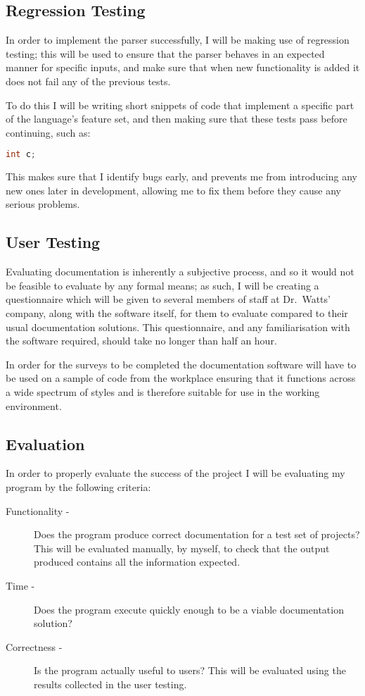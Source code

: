  \subsection{Regression Testing}
    In order to implement the parser successfully, I will be making use of
    regression testing; this will be used to ensure that the parser behaves
    in an expected manner for specific inputs, and make sure that when new
    functionality is added it does not fail any of the previous tests.

    To do this I will be writing short snippets of code that implement a
    specific part of the language's feature set, and then making sure that these
    tests pass before continuing, such as:

    \begin{lstlisting}[language=c, gobble=4]
      int c;
    \end{lstlisting}

    This makes sure that I identify bugs early, and prevents me from introducing
    any new ones later in development, allowing me to fix them before they cause
    any serious problems.

  \subsection{User Testing}
    Evaluating documentation is inherently a subjective process, and so it would
    not be feasible to evaluate by any formal means; as such, I will be creating
    a questionnaire which will be given to several members of staff at
    Dr.~Watts' company, along with the software itself, for them to evaluate
    compared to their usual documentation solutions. This questionnaire, and any
    familiarisation with the software required, should take no longer than half
    an hour.

    In order for the surveys to be completed the documentation software will
    have to be used on a sample of code from the workplace ensuring that it
    functions across a wide spectrum of styles and is therefore suitable for use
    in the working environment.

  \subsection{Evaluation}
    In order to properly evaluate the success of the project I will be
    evaluating my program by the following criteria:
    \begin{description}
      \item[Functionality -] Does the program produce correct documentation for
        a test set of projects? This will be evaluated manually, by myself, to
        check that the output produced contains all the information expected.
      \item[Time -] Does the program execute quickly enough to be a viable
        documentation solution?
      \item[Correctness -] Is the program actually useful to users? This will be
        evaluated using the results collected in the user testing.
    \end{description}


